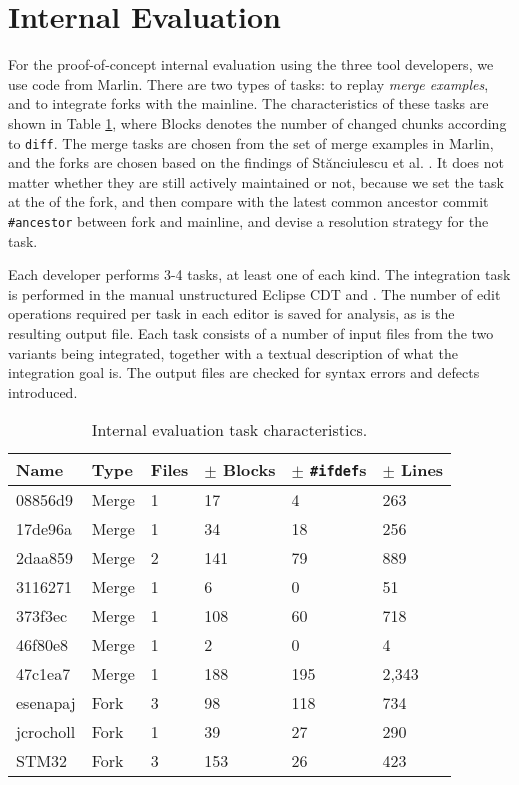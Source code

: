 \section{Internal Evaluation}
For the proof-of-concept internal evaluation using the three tool developers, we use code from Marlin. There are two types of tasks: to replay \textit{merge examples}, and to integrate forks with the mainline. The characteristics of these tasks are shown in Table \ref{tab:internalchar}, where Blocks denotes the number of changed chunks according to \texttt{diff}. The merge tasks are chosen from the set of merge examples in Marlin, and the forks are chosen based on the findings of St\u{a}nciulescu et al. \cite{stanciulescu2015}. It does not matter whether they are still actively maintained or not, because we set the task at the \head of the fork, and then compare with the latest common ancestor commit \texttt{\#ancestor} between fork and mainline, and devise a resolution strategy for the task.

Each developer performs 3-4 tasks, at least one of each kind. The integration task is performed in the manual unstructured Eclipse CDT and \tooln. The number of edit operations required per task in each editor is saved for analysis, as is the resulting output file. Each task consists of a number of input files from the two variants being integrated, together with a textual description of what the integration goal is. The output files are checked for syntax errors and defects introduced.

\begin{table}[ht]
    \centering
    \caption{Internal evaluation task characteristics.}
    \label{tab:internalchar}
    \begin{tabular}{lll|lll}
\hline\hline
\textbf{Name} & \textbf{Type} & \textbf{Files} & \textbf{$\pm$ Blocks} & \textbf{$\pm$ \texttt{\#ifdef}s} & \textbf{$\pm$ Lines} \\
\hline
08856d9      & Merge     & 1 & 17    & 4     & 263   \\
17de96a      & Merge     & 1 & 34    & 18    & 256   \\
2daa859      & Merge     & 2 & 141 & 79      & 889   \\
3116271      & Merge     & 1 & 6     & 0     & 51    \\
373f3ec      & Merge     & 1 & 108 & 60      & 718   \\
46f80e8      & Merge     & 1 & 2     & 0     & 4     \\
47c1ea7      & Merge     & 1 & 188   & 195   & 2,343 \\
\hline
esenapaj     & Fork         & 3 & 98    & 118   & 734   \\
jcrocholl    & Fork         & 1 & 39    & 27    & 290   \\
STM32        & Fork         & 3 & 153   & 26    & 423   \\
\hline\hline
    \end{tabular}
\end{table}

